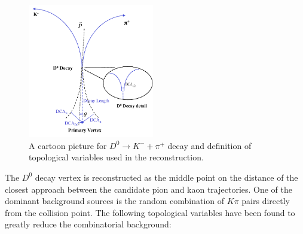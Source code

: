 \documentclass[%
 reprint,	
showpacs,
 amsmath,amssymb,
 aps,
 prc,
]{revtex4-1}
\providecommand{\DIFaddbegin}{} %
\providecommand{\DIFaddend}{} %
\providecommand{\DIFdelbegin}{} %
\providecommand{\DIFdelend}{} %
\providecommand{\DIFaddbeginFL}{} %
\providecommand{\DIFaddendFL}{} %
\providecommand{\DIFdelbeginFL}{} %
\providecommand{\DIFdelendFL}{} %
\begin{document}
\begin{table}
\label{table:singlecut} 
\end{table}

\DIFdelbegin %
\DIFdelendFL \DIFaddbeginFL \begin{figure}
\DIFaddendFL \centering
\DIFdelbeginFL %
\DIFdelendFL \DIFaddbeginFL \includegraphics[width=0.49\textwidth]{fig/D0carton.pdf}
\DIFaddendFL \caption{A cartoon picture for $D^0\rightarrow K^-+\pi^+$ decay and definition of topological variables used in the reconstruction.}
\label{fig:D0carton} 
\DIFdelbeginFL %
\DIFdelend \DIFaddbegin \end{figure}
\DIFaddend 

The $D^0$ decay vertex is reconstructed as the middle point on the distance of the closest approach between the candidate pion and kaon trajectories. One of the dominant background sources is the random combination of $K\pi$ pairs directly from the collision point. The following topological variables have been found to greatly reduce the combinatorial background:
\end{document}
